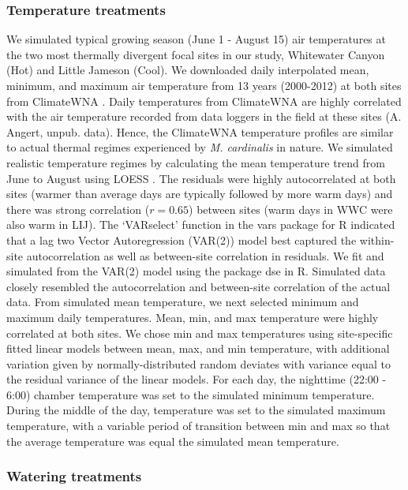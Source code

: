 \documentclass[11pt, oneside]{article}\usepackage[]{graphicx}\usepackage[]{color}
\newcommand{\pkg}[1]{{\fontseries{b}\selectfont #1}}
\begin{document}
\subsubsection*{Temperature treatments}

We simulated typical growing season (June 1 - August 15) air temperatures at the two most thermally divergent focal sites in our study, Whitewater Canyon (Hot) and Little Jameson (Cool). We downloaded daily interpolated mean, minimum, and maximum air temperature from 13 years (2000-2012) at both sites from ClimateWNA \citep{Wang_etal_2012}. Daily temperatures from ClimateWNA are highly correlated with the air temperature recorded from data loggers in the field at these sites (A. Angert, unpub. data). Hence, the ClimateWNA temperature profiles are similar to actual thermal regimes experienced by \textit{M. cardinalis} in nature. We simulated realistic temperature regimes by calculating the mean temperature trend from June to August using LOESS \citep{Cleveland_etal_1992}. The residuals were highly autocorrelated at both sites (warmer than average days are typically followed by more warm days) and there was strong correlation ($r = 0.65$) between sites (warm days in WWC were also warm in LIJ). The `VARselect' function in the \pkg{vars} package for R \citep{Pfaff_2008} indicated that a lag two Vector Autoregression (VAR(2)) model best captured the within-site autocorrelation as well as between-site correlation in residuals. We fit and simulated from the VAR(2) model using the package \pkg{dse} \citep{Gilbert_2014} in R. Simulated data closely resembled the autocorrelation and between-site correlation of the actual data. From simulated mean temperature, we next selected minimum and maximum daily temperatures. Mean, min, and max temperature were highly correlated at both sites. We chose min and max temperatures using site-specific fitted linear models between mean, max, and min temperature, with additional variation given by normally-distributed random deviates with variance equal to the residual variance of the linear models. For each day, the nighttime (22:00 - 6:00) chamber temperature was set to the simulated minimum temperature. During the middle of the day, temperature was set to the simulated maximum temperature, with a variable period of transition between min and max so that the average temperature was equal the simulated mean temperature.

\subsubsection*{Watering treatments}
\end{document}

